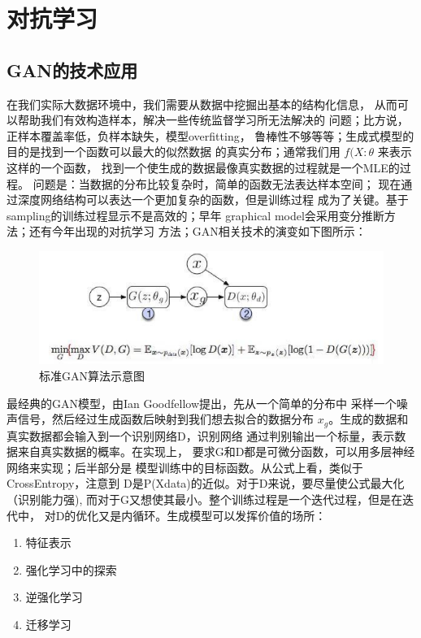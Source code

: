 
\chapter{对抗学习}
\thispagestyle{empty}

\setlength{\fboxrule}{0pt}\setlength{\fboxsep}{0cm}
\noindent\shadowbox{
\begin{tcolorbox}[arc=0mm,colback=lightblue,colframe=darkblue,title=学习目标与要求]

\end{tcolorbox}}
\setlength{\fboxrule}{1pt}\setlength{\fboxsep}{4pt} 


\section{GAN的技术应用} 

在我们实际大数据环境中，我们需要从数据中挖掘出基本的结构化信息，
从而可以帮助我们有效构造样本，解决一些传统监督学习所无法解决的
问题；比方说，正样本覆盖率低，负样本缺失，模型overfitting，
鲁棒性不够等等；生成式模型的目的是找到一个函数可以最大的似然数据
的真实分布；通常我们用 $f(X:\theta$ 来表示这样的一个函数，
找到一个使生成的数据最像真实数据的过程就是一个MLE的过程。
问题是：当数据的分布比较复杂时，简单的函数无法表达样本空间；
现在通过深度网络结构可以表达一个更加复杂的函数，但是训练过程
成为了关键。基于sampling的训练过程显示不是高效的；早年
graphical model会采用变分推断方法；还有今年出现的对抗学习
方法；GAN相关技术的演变如下图所示：


\begin{figure}[h]
\centering
\includegraphics[totalheight=1.8in]{fig/standard_gan.png}
\caption{ 标准GAN算法示意图 } \label{fig:gansamples}
\end{figure}

最经典的GAN模型，由Ian Goodfellow提出，先从一个简单的分布中
采样一个噪声信号，然后经过生成函数后映射到我们想去拟合的数据分布
$x_g$。生成的数据和真实数据都会输入到一个识别网络D，识别网络
通过判别输出一个标量，表示数据来自真实数据的概率。在实现上，
要求G和D都是可微分函数，可以用多层神经网络来实现；后半部分是
模型训练中的目标函数。从公式上看，类似于CrossEntropy，注意到
D是P(Xdata)的近似。对于D来说，要尽量使公式最大化（识别能力强), 
而对于G又想使其最小。整个训练过程是一个迭代过程，但是在迭代中，
对D的优化又是内循环。生成模型可以发挥价值的场所： 
\begin{enumerate}
	\item 特征表示
	\item 强化学习中的探索
	\item 逆强化学习
	\item 迁移学习
\end{enumerate}



